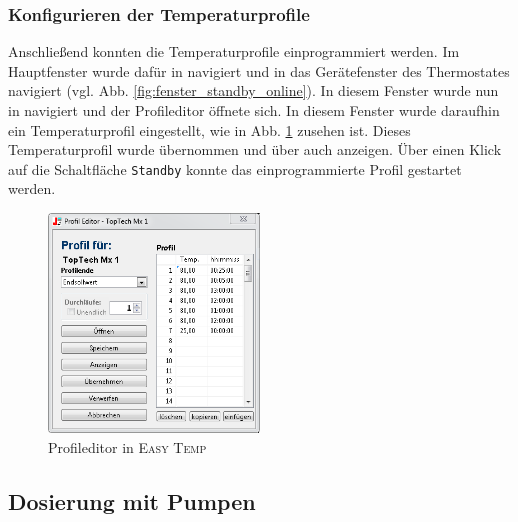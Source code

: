 \subsubsection*{Konfigurieren der Temperaturprofile}
Anschließend konnten die Temperaturprofile einprogrammiert werden. Im Hauptfenster wurde dafür in  navigiert und in das Gerätefenster des Thermostates navigiert (vgl. Abb. \ref{fig:fenster_standby_online}). In diesem Fenster wurde nun in  navigiert und der Profileditor öffnete sich. In diesem Fenster wurde daraufhin ein Temperaturprofil eingestellt, wie in Abb. \ref{fig:tprofil} zusehen ist. Dieses Temperaturprofil wurde übernommen und über  auch anzeigen. Über einen Klick auf die Schaltfläche \texttt{Standby} konnte das einprogrammierte Profil gestartet werden.

\begin{figure}[h!]
	\centering
	\includegraphics[width=0.5\textwidth]{img/julabo_5}
	\caption{Profileditor in \textsc{Easy Temp}}
	\label{fig:tprofil}
\end{figure}
\FloatBarrier

\subsection{Dosierung mit Pumpen}
 


